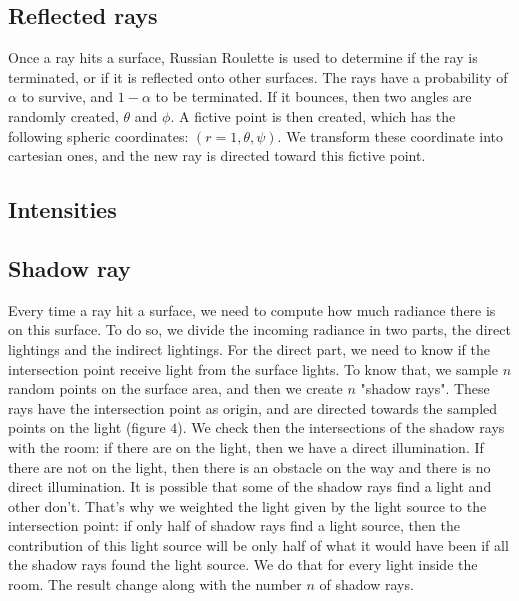 \documentclass[12pt]{article}
\numberwithin{equation}{section}
\begin{document}
\subsection{Reflected rays}
Once a ray hits a surface, Russian Roulette is used to determine if the ray is terminated, or if it is reflected onto other surfaces. The rays have a probability of $\alpha$ to survive, and $1-\alpha$ to be terminated. If it bounces, then two angles are randomly created, $\theta$ and $\phi$. A fictive point is then created, which has the following spheric coordinates: $(r=1, \theta, \psi)$. We transform these coordinate into cartesian ones, and the new ray is directed toward this fictive point.

\subsection{Intensities}

\subsection{Shadow ray}

Every time a ray hit a surface, we need to compute how much radiance there is on this surface. To do so, we divide the incoming radiance in two parts, the direct lightings and the indirect lightings. For the direct part, we need to know if the intersection point receive light from the surface lights. To know that, we sample $n$ random points on the surface area, and then we create $n$ "shadow rays". These rays have the intersection point as origin, and are directed towards the sampled points on the light (figure $4$). We check then the intersections of the shadow rays with the room: if there are on the light, then we have a direct illumination. If there are not on the light, then there is an obstacle on the way and there is no direct illumination. It is possible that some of the shadow rays find a light and other don't. That's why we weighted the light given by the light source to the intersection point: if only half of shadow rays find a light source, then the contribution of this light source will be only half of what it would have been if all the shadow rays found the light source. We do that for every light inside the room. The result change along with the number $n$ of shadow rays.
\end{document}
